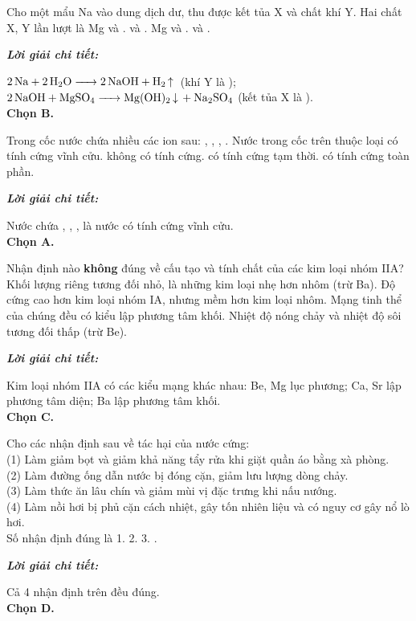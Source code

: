 \documentclass[11pt,a4paper]{article}
\def\loigiai#1{
\par\begingroup\color{blue!80!black}\small
\noindent\textbf{\textit{Lời giải chi tiết:}}\par
#1\par\endgroup}
\begin{document}
\begin{ex}
Cho một mẩu Na vào dung dịch  dư, thu được kết tủa X và chất khí Y. Hai chất X, Y lần lượt là
\choice
{Mg và .}
{\True {} và .}
{Mg và .}
{ và .}
\loigiai{
$\ce{2Na + 2H2O -> 2NaOH + H2 ^}$ (khí Y là \ce{H2});\\
$\ce{2NaOH + MgSO4 -> Mg(OH)2 v + Na2SO4}$ (kết tủa X là \ce{Mg(OH)2}).\\
\textbf{Chọn B.}}
\end{ex}

\begin{ex}
Trong cốc nước chứa nhiều các ion sau: , , , . Nước trong cốc trên thuộc loại
\choice
{\True có tính cứng vĩnh cửu.}
{không có tính cứng.}
{có tính cứng tạm thời.}
{có tính cứng toàn phần.}
\loigiai{
Nước chứa , , , \ce{SO4^2-} là nước có tính cứng vĩnh cửu.\\
\textbf{Chọn A.}}
\end{ex}

\begin{ex}
Nhận định nào \textbf{không} đúng về cấu tạo và tính chất của các kim loại nhóm IIA?
\choice
{Khối lượng riêng tương đối nhỏ, là những kim loại nhẹ hơn nhôm (trừ Ba).}
{Độ cứng cao hơn kim loại nhóm IA, nhưng mềm hơn kim loại nhôm.}
{\True Mạng tinh thể của chúng đều có kiểu lập phương tâm khối.}
{Nhiệt độ nóng chảy và nhiệt độ sôi tương đối thấp (trừ Be).}
\loigiai{
Kim loại nhóm IIA có các kiểu mạng khác nhau: Be, Mg lục phương; Ca, Sr lập phương tâm diện; Ba lập phương tâm khối.\\
\textbf{Chọn C.}}
\end{ex}

\begin{ex}
Cho các nhận định sau về tác hại của nước cứng:\\
(1) Làm giảm bọt và giảm khả năng tẩy rửa khi giặt quần áo bằng xà phòng.\\
(2) Làm đường ống dẫn nước bị đóng cặn, giảm lưu lượng dòng chảy.\\
(3) Làm thức ăn lâu chín và giảm mùi vị đặc trưng khi nấu nướng.\\
(4) Làm nồi hơi bị phủ cặn cách nhiệt, gây tốn nhiên liệu và có nguy cơ gây nổ lò hơi.\\
Số nhận định đúng là
\choice
{1.}
{2.}
{3.}
{.}
\loigiai{
Cả 4 nhận định trên đều đúng.\\
\textbf{Chọn D.}}
\end{ex}
\end{document}
